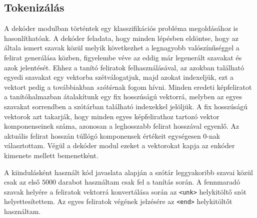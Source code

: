 \begin{multicols}{2}
\subsection{Tokenizálás}
A dekóder modulban történtek egy klasszifikációs probléma megoldásához is hasonlíthatóak. A dekóder feladata, hogy minden lépésben eldöntse, hogy az általa ismert szavak közül melyik következhet a legnagyobb valószínűséggel a felirat generálása közben, figyelembe véve az eddig már legenerált szavakat és azok jelentését. Ehhez a tanító feliratok felhasználásával, az azokban található egyedi szavakat egy vektorba szétválogatjuk, majd azokat indexeljük, ezt a vektort pedig a továbbiakban \emph{szótár}nak fogom hívni. Minden eredeti képfeliratot a tanítóhalmazban átalakítunk egy fix hosszúságú vektorrá, melyben az egyes szavakat sorrendben a szótárban található indexekkel jelöljük. A fix hosszúságú vektorok azt takarják, hogy minden egyes képfelirathoz tartozó vektor komponenseinek száma, azonosan a leghosszabb felirat hosszával egyenlő. Az aktuális felirat hosszán túllógó komponensek értékeit egységesen $0$-nak választottam. Végül a dekóder modul ezeket a vektorokat kapja az enkóder kimenete mellett bemenetként. \par
A kiindulásként használt kód javaslata alapján a szótár leggyakoribb szavai közül csak az első $5000$ darabot használtam csak fel a tanítás során. A fennmaradó szavak helyére a feliratok vektorrá konvertálása során az \texttt{<unk>} helykitöltő szót helyettesítettem. Az egyes feliratok végének jelzésére az \texttt{<end>} helykitöltőt használtam.


\end{multicols}
